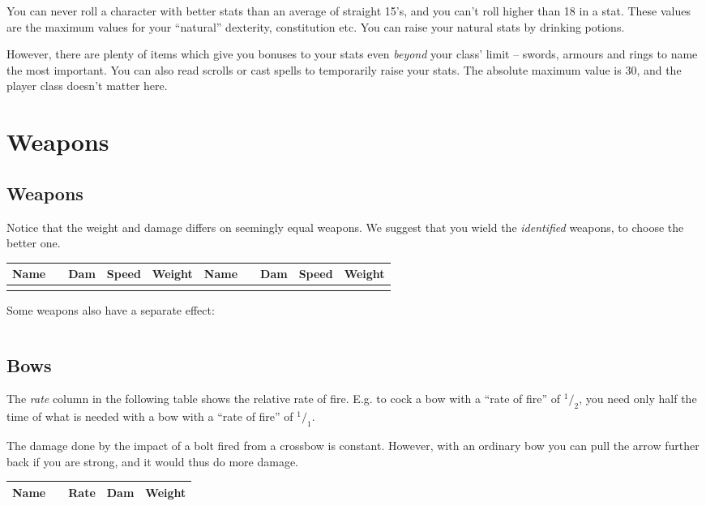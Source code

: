 \documentclass[11pt, a4paper]{article}
\begin{document}
You can never roll a character with better stats than an average of
straight 15's, and you can't roll higher than 18 in a stat. These
values are the maximum values for your ``natural'' dexterity,
constitution etc. You can raise your natural stats by drinking
potions.

However, there are plenty of items which give you bonuses to your
stats even {\em beyond} your class' limit -- swords, armours and rings to
name the most important. You can also read scrolls or cast spells to
temporarily raise your stats.  The absolute maximum value is 30, and
the player class doesn't matter here.

\section*{Weapons}

\subsection*{Weapons}
Notice that the weight and damage differs on seemingly equal weapons.
We suggest that you wield the {\em identified} weapons,
to choose the better one.

{\small 
\begin{longtable}{|c|c|r|r|r|c|c|r|r|r|}
\hline
Name&&Dam&Speed&Weight&Name&&Dam&Speed&Weight\\
\hline
\hline
\endhead
\hline
\endfoot

\end{longtable}
}

Some weapons also have a separate effect:

{\small 
\begin{tabular}{l c p{10cm}}

\end{tabular}
}
\subsection*{Bows}

The {\em rate} column in the following table shows the relative rate
of fire. E.g. to cock a bow with a ``rate of fire'' of $^1/_2$, you
need only half the time of what is needed with a bow with a ``rate of
fire'' of $^1/_1$.

The damage done by the impact of a bolt fired from a crossbow is
constant.  However, with an ordinary bow you can pull the arrow
further back if you are strong, and it would thus do more damage.

{\small 
\begin{center}
\begin{tabular} {|c|c|r|r|r|}
\hline
Name&&Rate&Dam&Weight\\
\hline
\hline

\hline
\end{tabular}
\end{center}
}
\end{document}
